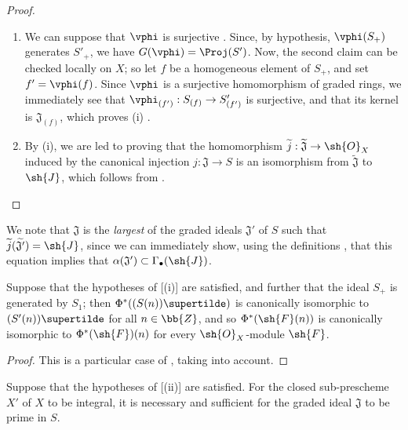 \begin{proof}
\medskip\noindent
\begin{enumerate}
  \item[\rm{(i)}] We can suppose that $\vphi$ is surjective .
    Since, by hypothesis, $\vphi(S_+)$ generates $S'_+$, we have $G(\vphi)=\Proj(S')$.
    Now, the second claim can be checked locally on $X$;
    so let $f$ be a homogeneous element of $S_+$, and set $f'=\vphi(f)$.
    Since $\vphi$ is a surjective homomorphism of graded rings, we immediately see that $\vphi_{(f')}:S_{(f)}\to S'_{(f')}$ is surjective, and that its kernel is $\mathfrak{J}_{(f)}$, which proves (i) .
  \item[\rm{(ii)}] By (i), we are led to proving that the homomorphism $\widetilde{j}:\widetilde{\mathfrak{J}}\to\sh{O}_X$ induced by the canonical injection $j:\mathfrak{J}\to S$ is an isomorphism from $\widetilde{\mathfrak{J}}$ to $\sh{J}$, which follows from .
\end{enumerate}
\end{proof}

We note that $\mathfrak{J}$ is the \emph{largest} of the graded ideals $\mathfrak{J}'$ of $S$ such that $\widetilde{j}(\widetilde{\mathfrak{J'}})=\sh{J}$, since we can immediately show, using the definitions , that this equation implies that $\alpha(\mathfrak{J}')\subset\Gamma_\bullet(\sh{J})$.

\begin{corollary}[2.9.3]
\label{II.2.9.3}
Suppose that the hypotheses of [(i)] are satisfied, and further that the ideal $S_+$ is generated by $S_1$;
then $\Phi^*((S(n))\supertilde)$ is canonically isomorphic to $(S'(n))\supertilde$ for all $n\in\bb{Z}$, and so $\Phi^*(\sh{F}(n))$ is canonically isomorphic to $\Phi^*(\sh{F})(n)$ for every $\sh{O}_X$-module $\sh{F}$.
\end{corollary}

\begin{proof}
This is a particular case of , taking  into account.
\end{proof}

\begin{corollary}[2.9.4]
\label{II.2.9.4}
Suppose that the hypotheses of [(ii)] are satisfied.
For the closed sub-prescheme $X'$ of $X$ to be integral, it is necessary and sufficient for the graded ideal $\mathfrak{J}$ to be prime in $S$.
\end{corollary}

